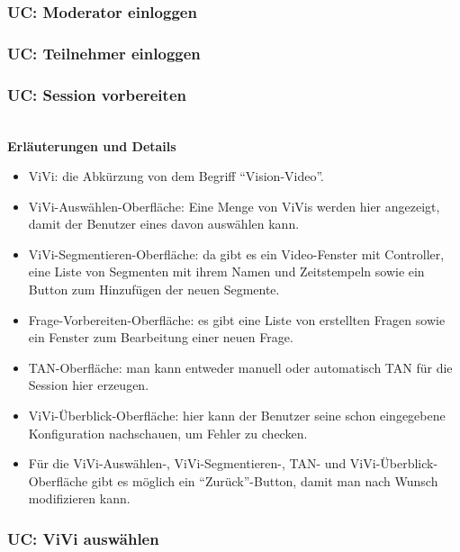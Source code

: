 \subsubsection{UC: Moderator einloggen}

\pagebreak

\subsubsection{UC: Teilnehmer einloggen}

\pagebreak

\subsubsection{UC: Session vorbereiten}

\\[0.5cm]
\textbf{Erläuterungen und Details}
\begin{itemize}
	\item ViVi: die Abkürzung von dem Begriff ``Vision-Video''.
	\item ViVi-Auswählen-Oberfläche: Eine Menge von ViVis werden hier angezeigt, damit der Benutzer eines davon auswählen kann.
	\item ViVi-Segmentieren-Oberfläche: da gibt es ein Video-Fenster mit Controller, eine Liste von Segmenten mit ihrem Namen und Zeitstempeln sowie ein Button zum Hinzufügen der neuen Segmente. 
	\item Frage-Vorbereiten-Oberfläche: es gibt eine Liste von erstellten Fragen
	sowie ein Fenster zum Bearbeitung einer neuen Frage.
	\item TAN-Oberfläche: man kann entweder manuell oder automatisch TAN für die Session hier erzeugen.
	\item ViVi-Überblick-Oberfläche: hier kann der Benutzer seine schon eingegebene Konfiguration nachschauen, um Fehler zu checken.
	\item Für die ViVi-Auswählen-, ViVi-Segmentieren-, TAN- und ViVi-Überblick-Oberfläche gibt es möglich ein ``Zurück''-Button, damit man nach Wunsch modifizieren kann.
\end{itemize}
\pagebreak

\subsubsection{UC: ViVi auswählen}

\\[0.5cm]
\pagebreak

